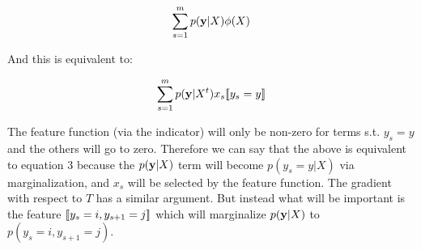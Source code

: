 \documentclass[11pt]{report}
\begin{document}
	\begin{align}
	\sum_{s=1}^{m} p(\mathbf{\boldsymbol{y}}|X)\phi(X)
	\end{align}

And this is equivalent to:

	\begin{align}
	\sum_{s=1}^{m} p(\mathbf{\boldsymbol{y}}|X^t)x_s [\![y_s=y]\!]
	\end{align}

The feature function (via the indicator) will only be non-zero for terms s.t. $y_s=y$ and the others will go to zero. Therefore we can say that the above is equivalent to equation 3 because the 
$p(\mathbf{\boldsymbol{y}}|X)$ term will become $p(y_s=y|X)$ via marginalization, and $x_s$ will be selected by the feature function. The gradient with respect to $T$ has a similar argument. But instead what will be 
important is the feature $[\![y_s = i, y_{s+1} = j]\!]$ which will marginalize $p(\mathbf{\boldsymbol{y}}|X)$ to $p(y_s=i,y_{s+1}=j)$. 
	
	
\end{document}
